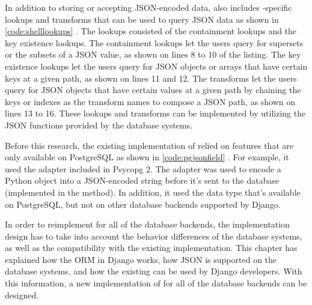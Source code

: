 \noindent
\begin{minipage}{\linewidth}

\end{minipage}

In addition to storing or accepting JSON-encoded data,  also
includes -specific lookups and transforms that can be used to
query JSON data as shown in \autoref{code:shelllookups}
\cite{django30_modeljsonfield}. The lookups consisted of the containment
lookups and the key existence lookups. The containment lookups let the users
query for supersets or the subsets of a JSON value, as shown on lines 8 to 10
of the listing. The key existence lookups let the users query for JSON objects
or arrays that have certain keys at a given path, as shown on lines 11 and 12.
The transforms let the users query for JSON objects that have certain values at
a given path by chaining the keys or indexes as the transform names to compose
a JSON path, as shown on lines 13 to 16. These lookups and transforms can be
implemented by utilizing the JSON functions provided by the database systems.

\noindent
\begin{minipage}{\linewidth}

\end{minipage}

Before this research, the existing implementation of  relied on
features that are only available on PostgreSQL as shown in
\autoref{code:pgjsonfield} \cite{django:pgjsonfield}. For example, it used the
 adapter included in Psycopg 2. The adapter was used to encode a
Python object into a JSON-encoded string before it's sent to the database
(implemented in the  method). In addition, it used the
 data type that's available on PostgreSQL, but not on other
database backends supported by Django.

In order to reimplement  for all of the database backends, the
implementation design has to take into account the behavior differences of the
database systems, as well as the compatibility with the existing
implementation. This chapter has explained how the ORM in Django works, how
JSON is supported on the database systems, and how the existing
 can be used by Django developers. With this information, a new
implementation of  for all of the database backends can be
designed.
